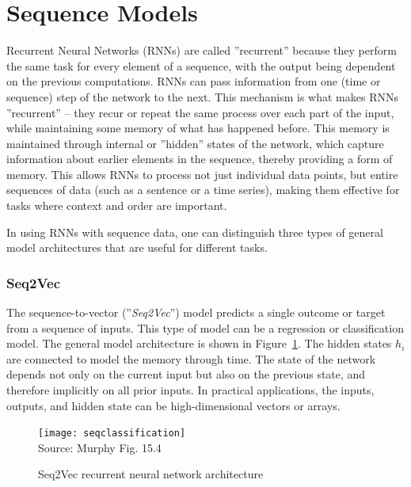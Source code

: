 \section{Sequence Models}

Recurrent Neural Networks (RNNs) are called ''recurrent'' because they perform the same task for every element of a sequence, with the output being dependent on the previous computations. RNNs can pass information from one (time or sequence) step of the network to the next. This mechanism is what makes RNNs ''recurrent'' -- they recur or repeat the same process over each part of the input, while maintaining some memory of what has happened before. This memory is maintained through internal or ''hidden'' states of the network, which capture information about earlier elements in the sequence, thereby providing a form of memory. This allows RNNs to process not just individual data points, but entire sequences of data (such as a sentence or a time series), making them effective for tasks where context and order are important.

In using RNNs with sequence data, one can distinguish three types of general model architectures that are useful for different tasks.

\subsubsection*{Seq2Vec}

The sequence-to-vector (''\emph{Seq2Vec}'') model predicts a single outcome or target from a sequence of inputs. This type of model can be a regression or classification model. The general model architecture is shown in Figure~\ref{fig:seqclassification}. The hidden states $h_i$ are connected to model the memory through time. The state of the network depends not only on the current input but also on the previous state, and therefore implicitly on all prior inputs. In practical applications, the inputs, outputs, and hidden state can be high-dimensional vectors or arrays.

\begin{figure}[b]
\centering
\texttt{[image: seqclassification]} \\

\scriptsize Source: Murphy Fig. 15.4
\caption{Seq2Vec recurrent neural network architecture}
\label{fig:seqclassification}
\end{figure}

